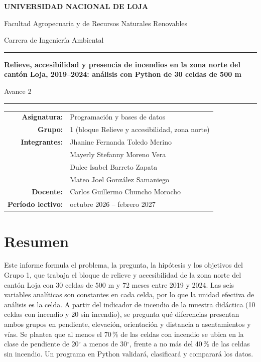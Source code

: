 \documentclass[11pt,a4paper]{article}
\newcommand{\gr}[1]{$#1^{\circ}$}
\begin{document}
\hypersetup{pageanchor=false}

\begin{titlepage}
\centering
\vspace*{2.0cm}
{\Large\bfseries UNIVERSIDAD NACIONAL DE LOJA\par}
\vspace{0.3cm}
{\large Facultad Agropecuaria y de Recursos Naturales Renovables\par}
{\large Carrera de Ingeniería Ambiental\par}
\vspace{1.3cm}
{\color{verde}\rule{0.82\linewidth}{1.3pt}\par}
\vspace{0.55cm}
{\huge\bfseries Relieve, accesibilidad y presencia de incendios en la zona norte del cantón Loja, 2019--2024: análisis con Python de 30 celdas de 500 m\par}
\vspace{0.45cm}
{\Large Avance 2\par}
\vspace{0.55cm}
{\color{verde}\rule{0.82\linewidth}{1.3pt}\par}
\vfill
\begin{tabular}{rl}
\textbf{Asignatura:} & Programación y bases de datos\\
\textbf{Grupo:} & 1 (bloque Relieve y accesibilidad, zona norte)\\
\textbf{Integrantes:} & Jhanine Fernanda Toledo Merino\\
 & Mayerly Stefanny Moreno Vera\\
 & Dulce Isabel Barreto Zapata\\
 & Mateo Joel González Samaniego\\
\textbf{Docente:} & Carlos Guillermo Chuncho Morocho\\
\textbf{Período lectivo:} & octubre 2026 -- febrero 2027\\
\end{tabular}
\vspace{1cm}
\end{titlepage}
\hypersetup{pageanchor=true}

\section*{Resumen}
Este informe formula el problema, la pregunta, la hipótesis y los objetivos del Grupo 1, que trabaja el bloque de relieve y accesibilidad de la zona norte del cantón Loja con 30 celdas de 500 m y 72 meses entre 2019 y 2024. Las seis variables analíticas son constantes en cada celda, por lo que la unidad efectiva de análisis es la celda. A partir del indicador de incendio de la muestra didáctica (10 celdas con incendio y 20 sin incendio), se pregunta qué diferencias presentan ambos grupos en pendiente, elevación, orientación y distancia a asentamientos y vías. Se plantea que al menos el 70\,\% de las celdas con incendio se ubica en la clase de pendiente de 20\gr{} a menos de 30\gr{}, frente a no más del 40\,\% de las celdas sin incendio. Un programa en Python validará, clasificará y comparará los datos.
\end{document}
